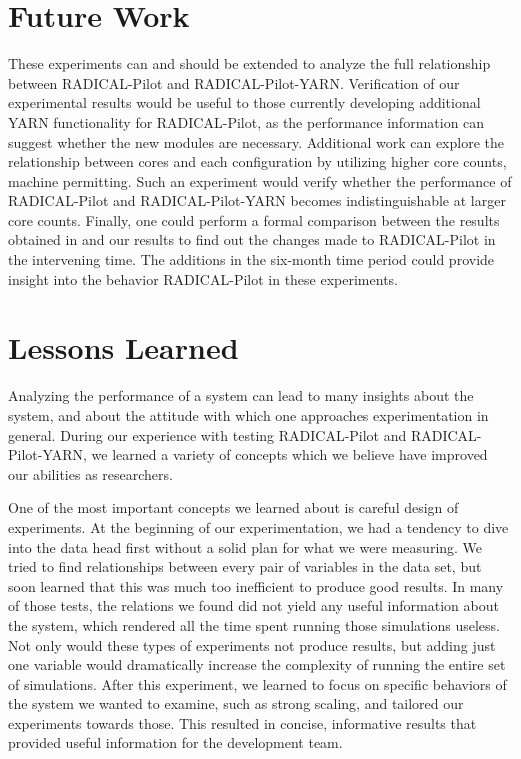 \documentclass[]{article}
\begin{document}
\section{Future Work}
	These experiments can and should be extended to analyze the full relationship between RADICAL-Pilot and RADICAL-Pilot-YARN. Verification of our experimental results would be useful to those currently developing additional YARN functionality for RADICAL-Pilot, as the performance information can suggest whether the new modules are necessary. Additional work can explore the relationship between cores and each configuration by utilizing higher core counts, machine permitting. Such an experiment would verify whether the performance of RADICAL-Pilot and RADICAL-Pilot-YARN becomes indistinguishable at larger core counts. Finally, one could perform a formal comparison between the results obtained in \cite{hadoop_paper} and our results to find out the changes made to RADICAL-Pilot in the intervening time. The additions in the six-month time period could provide insight into the behavior RADICAL-Pilot in these experiments.

\section{Lessons Learned}
	
	Analyzing the performance of a system can lead to many insights about the system, and about the attitude with which one approaches experimentation in general. During our experience with testing RADICAL-Pilot and RADICAL-Pilot-YARN, we learned a variety of concepts which we believe have improved our abilities as researchers.

	One of the most important concepts we learned about is careful design of experiments. At the beginning of our experimentation, we had a tendency to dive into the data head first without a solid plan for what we were measuring. We tried to find relationships between every pair of variables in the data set, but soon learned that this was much too inefficient to produce good results. In many of those tests, the relations we found did not yield any useful information about the system, which rendered all the time spent running those simulations useless. Not only would these types of experiments not produce results, but adding just one variable would dramatically increase the complexity of running the entire set of simulations. After this experiment, we learned to focus on specific behaviors of the system we wanted to examine, such as strong scaling, and tailored our experiments towards those. This resulted in concise, informative results that provided useful information for the development team.
\end{document}
